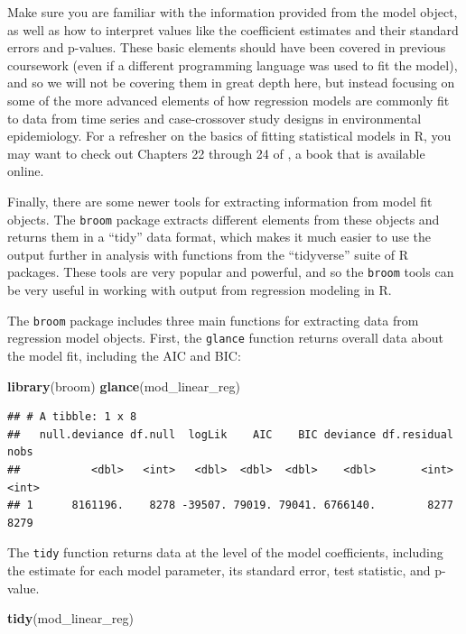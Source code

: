 \documentclass[
]{book}
\newenvironment{Shaded}{\begin{snugshade}}{\end{snugshade}}
\newcommand{\KeywordTok}[1]{\textcolor[rgb]{0.13,0.29,0.53}{\textbf{#1}}}
\newcommand{\NormalTok}[1]{#1}
\begin{document}
Make sure you are familiar with the information provided from the model object,
as well as how to interpret values like the coefficient estimates and their
standard errors and p-values. These basic elements should have been covered in
previous coursework (even if a different programming language was used to fit
the model), and so we will not be covering them in great depth here, but instead
focusing on some of the more advanced elements of how regression models are
commonly fit to data from time series and case-crossover study designs in
environmental epidemiology. For a refresher on the basics of fitting
statistical models in R, you may want to check out Chapters 22 through 24 of
\citet{wickham2016r}, a book that is available online.

Finally, there are some newer tools for extracting information from model fit
objects. The \texttt{broom} package extracts different elements from these objects
and returns them in a ``tidy'' data format, which makes it much easier to use
the output further in analysis with functions from the ``tidyverse'' suite of
R packages. These tools are very popular and powerful, and so the \texttt{broom} tools
can be very useful in working with output from regression modeling in R.

The \texttt{broom} package includes three main functions for extracting data from
regression model objects. First, the \texttt{glance} function returns overall data
about the model fit, including the AIC and BIC:

\begin{Shaded}
\begin{Highlighting}[]
\KeywordTok{library}\NormalTok{(broom)}
\KeywordTok{glance}\NormalTok{(mod_linear_reg)}
\end{Highlighting}
\end{Shaded}

\begin{verbatim}
## # A tibble: 1 x 8
##   null.deviance df.null  logLik    AIC    BIC deviance df.residual  nobs
##           <dbl>   <int>   <dbl>  <dbl>  <dbl>    <dbl>       <int> <int>
## 1      8161196.    8278 -39507. 79019. 79041. 6766140.        8277  8279
\end{verbatim}

The \texttt{tidy} function returns data at the level of the model coefficients,
including the estimate for each model parameter, its standard error, test
statistic, and p-value.

\begin{Shaded}
\begin{Highlighting}[]
\KeywordTok{tidy}\NormalTok{(mod_linear_reg)}
\end{Highlighting}
\end{Shaded}
\end{document}

